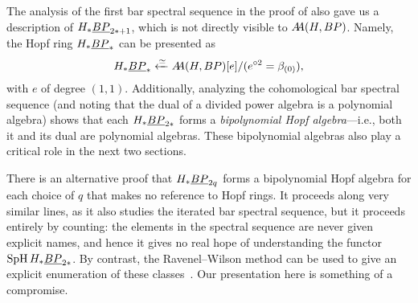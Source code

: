 \begin{remark}
The analysis of the first bar spectral sequence in the proof of  also gave us a description of \(H_* \OS{BP}{2*+1}\), which is not directly visible to \(\AA(H, BP)\).  Namely, the Hopf ring \(H_* \OS{BP}{*}\) can be presented as \[H_* \OS{BP}{*} \xleftarrow{\simeq} \AA(H, BP)[e] / (e^{\circ 2} = \beta_{(0)}),\] with \(e\) of degree \((1, 1)\).  Additionally, analyzing the cohomological bar spectral sequence (and noting that the dual of a divided power algebra is a polynomial algebra) shows that each \(H_* \OS{BP}{2*}\) forms a \textit{bipolynomial Hopf algebra}---i.e., both it and its dual are polynomial algebras.  These bipolynomial algebras also play a critical role in the next two sections.
\end{remark}

\begin{remark}
There is an alternative proof that \(H_* \OS{BP}{2q}\) forms a bipolynomial Hopf algebra for each choice of \(q\) that makes no reference to Hopf rings.  It proceeds along very similar lines, as it also studies the iterated bar spectral sequence, but it proceeds entirely by counting: the elements in the spectral sequence are never given explicit names, and hence it gives no real hope of understanding the functor \(\SpH H_* \OS{BP}{2*}\).  By contrast, the Ravenel--Wilson method can be used to give an explicit enumeration of these classes~\cite[Section 5]{RavenelWilsonHopfRingForMU}.  Our presentation here is something of a compromise.
\end{remark}

